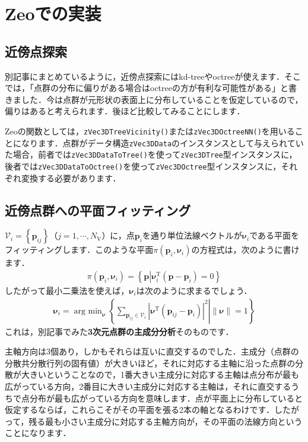 ﻿\documentclass[a4paper]{jsarticle}
\begin{document}
\section{Zeoでの実装}

\subsection{近傍点探索}

別記事にまとめているように，近傍点探索にはkd-treeやoctreeが使えます．そこでは，「点群の分布に偏りがある場合はoctreeの方が有利な可能性がある」と書きました．今は点群が元形状の表面上に分布していることを仮定しているので，偏りはあると考えられます．後ほど比較してみることにします．

Zeoの関数としては，\verb|zVec3DTreeVicinity()|または\verb|zVec3DOctreeNN()|を用いることになります．点群がデータ構造\verb|zVec3DData|のインスタンスとして与えられていた場合，前者では\verb|zVec3DDataToTree()|を使って\verb|zVec3DTree|型インスタンスに，後者では\verb|zVec3DDataToOctree()|を使って\verb|zVec3DOctree|型インスタンスに，それぞれ変換する必要があります．


\subsection{近傍点群への平面フィッティング}

$\mathcal{V}_{i}=\left\{\boldsymbol{p}_{ij}\right\}$（$j=1,\cdots,N_{\mathrm{V}}$）に，点$\boldsymbol{p}_{i}$を通り単位法線ベクトルが$\boldsymbol{\nu}_{i}$である平面をフィッティングします．このような平面$\pi(\boldsymbol{p}_{i},\boldsymbol{\nu}_{i})$の方程式は，次のように書けます．
\begin{align*}
\pi(\boldsymbol{p}_{i},\boldsymbol{\nu}_{i})=\left\{\boldsymbol{p}\left|\boldsymbol{\nu}_{i}^{\mathrm{T}}(\boldsymbol{p}-\boldsymbol{p}_{i})=0\right.\right\}
\end{align*}
したがって最小二乗法を使えば，$\boldsymbol{\nu}_{i}$は次のように求まるでしょう．
\begin{align*}
\boldsymbol{\nu}_{i}=\mathop{\mathrm{arg~min}}_{\boldsymbol{\nu}}\left\{\left.
\sum_{\boldsymbol{p}_{ij}\in\mathcal{V}_{i}}|\boldsymbol{\nu}^{\mathrm{T}}(\boldsymbol{p}_{ij}-\boldsymbol{p}_{i})|^{2}
\right|\|\boldsymbol{\nu}\|=1
\right\}
\end{align*}
これは，別記事でみた{\bf 3次元点群の主成分分析}そのものです．

主軸方向は3個あり，しかもそれらは互いに直交するのでした．主成分（点群の分散共分散行列の固有値）が大きいほど，それに対応する主軸に沿った点群の分散が大きいということなので，1番大きい主成分に対応する主軸は点分布が最も広がっている方向，2番目に大きい主成分に対応する主軸は，それに直交するうちで点分布が最も広がっている方向を意味します．点が平面上に分布していると仮定するならば，これらこそがその平面を張る2本の軸となるわけです．したがって，残る最も小さい主成分に対応する主軸方向が，その平面の法線方向ということになります．
\end{document}
